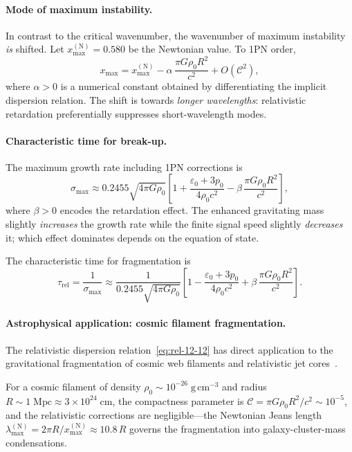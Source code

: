 \paragraph{Mode of maximum instability.}
In contrast to the critical wavenumber, the wavenumber of maximum
instability \emph{is} shifted.  Let $x_{\max}^{\mathrm{(N)}}=0.580$ be
the Newtonian value.  To 1PN order,
\begin{equation}
\label{eq:rel-12-17}
x_{\max} = x_{\max}^{\mathrm{(N)}}
  - \alpha\,\frac{\pi G\rho_{0}R^{2}}{c^{2}} + O(\mathcal{C}^{2}),
\end{equation}
where $\alpha > 0$ is a numerical constant obtained by differentiating
the implicit dispersion relation.  The shift is towards \emph{longer
wavelengths}: relativistic retardation preferentially suppresses
short-wavelength modes.

\paragraph{Characteristic time for break-up.}
The maximum growth rate including 1PN corrections is
\begin{equation}
\label{eq:rel-12-18}
\sigma_{\max} \approx 0.2455\sqrt{4\pi G\rho_{0}}
  \left[1 + \frac{\varepsilon_{0}+3p_{0}}{4\rho_{0}c^{2}}
  - \beta\,\frac{\pi G\rho_{0}R^{2}}{c^{2}}\right],
\end{equation}
where $\beta>0$ encodes the retardation effect.  The enhanced
gravitating mass slightly \emph{increases} the growth rate while the
finite signal speed slightly \emph{decreases} it; which effect dominates
depends on the equation of state.

The characteristic time for fragmentation is
\begin{equation}
\label{eq:rel-12-19}
\tau_{\mathrm{rel}} = \frac{1}{\sigma_{\max}}
  \approx \frac{1}{0.2455\sqrt{4\pi G\rho_{0}}}
  \left[1 - \frac{\varepsilon_{0}+3p_{0}}{4\rho_{0}c^{2}}
  + \beta\,\frac{\pi G\rho_{0}R^{2}}{c^{2}}\right].
\end{equation}

\paragraph{Astrophysical application: cosmic filament fragmentation.}
The relativistic dispersion relation~\eqref{eq:rel-12-12} has direct
application to the gravitational fragmentation of cosmic web filaments
and relativistic jet cores~\cite{Blandford2019}.

For a cosmic filament of density
$\rho_{0} \sim 10^{-26}\;\mathrm{g\,cm^{-3}}$ and radius
$R \sim 1\;\mathrm{Mpc} \approx 3\times 10^{24}\;\mathrm{cm}$, the
compactness parameter is
$\mathcal{C} = \pi G\rho_{0}R^{2}/c^{2} \sim 10^{-5}$, and the
relativistic corrections are negligible---the Newtonian Jeans length
$\lambda_{\max}^{(\mathrm{N})} = 2\pi R/x_{\max}^{(\mathrm{N})}
\approx 10.8\,R$ governs the fragmentation into galaxy-cluster-mass
condensations.

